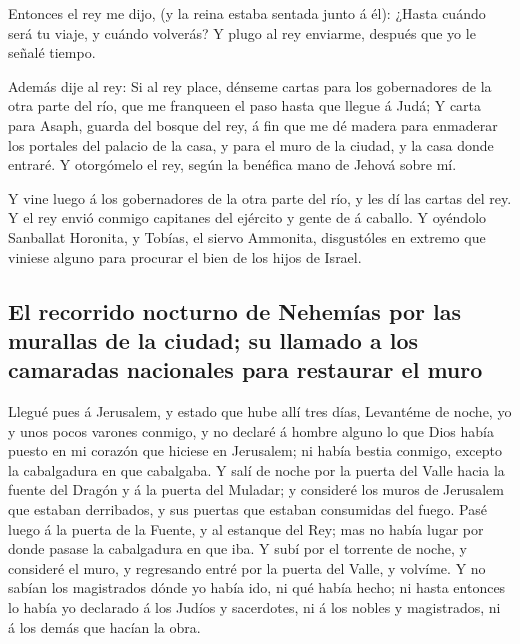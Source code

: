  Entonces el rey me dijo, (y la reina estaba sentada junto
á él): ¿Hasta cuándo será tu viaje, y cuándo volverás? Y plugo al rey
enviarme, después que yo le señalé tiempo.

 Además dije al rey: Si al rey place, dénseme cartas para
los gobernadores de la otra parte del río, que me franqueen el paso
hasta que llegue á Judá;  Y carta para Asaph, guarda del
bosque del rey, á fin que me dé madera para enmaderar los portales del
palacio de la casa, y para el muro de la ciudad, y la casa donde
entraré. Y otorgómelo el rey, según la benéfica mano de Jehová sobre mí.

 Y vine luego á los gobernadores de la otra parte del río,
y les dí las cartas del rey. Y el rey envió conmigo capitanes del
ejército y gente de á caballo.  Y oyéndolo Sanballat
Horonita, y Tobías, el siervo Ammonita, disgustóles en extremo que
viniese alguno para procurar el bien de los hijos de Israel.

\hypertarget{el-recorrido-nocturno-de-nehemuxedas-por-las-murallas-de-la-ciudad-su-llamado-a-los-camaradas-nacionales-para-restaurar-el-muro}{%
\subsection{El recorrido nocturno de Nehemías por las murallas de la
ciudad; su llamado a los camaradas nacionales para restaurar el
muro}\label{el-recorrido-nocturno-de-nehemuxedas-por-las-murallas-de-la-ciudad-su-llamado-a-los-camaradas-nacionales-para-restaurar-el-muro}}

 Llegué pues á Jerusalem, y estado que hube allí tres
días,  Levantéme de noche, yo y unos pocos varones
conmigo, y no declaré á hombre alguno lo que Dios había puesto en mi
corazón que hiciese en Jerusalem; ni había bestia conmigo, excepto la
cabalgadura en que cabalgaba.  Y salí de noche por la
puerta del Valle hacia la fuente del Dragón y á la puerta del Muladar; y
consideré los muros de Jerusalem que estaban derribados, y sus puertas
que estaban consumidas del fuego.  Pasé luego á la puerta
de la Fuente, y al estanque del Rey; mas no había lugar por donde pasase
la cabalgadura en que iba.  Y subí por el torrente de
noche, y consideré el muro, y regresando entré por la puerta del Valle,
y volvíme.  Y no sabían los magistrados dónde yo había
ido, ni qué había hecho; ni hasta entonces lo había yo declarado á los
Judíos y sacerdotes, ni á los nobles y magistrados, ni á los demás que
hacían la obra.

